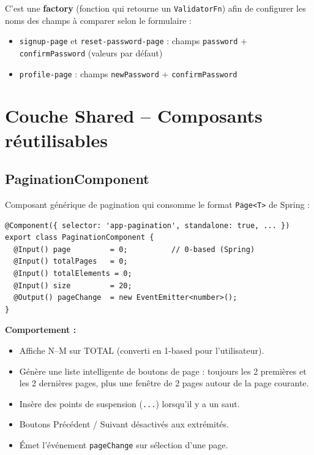 \documentclass[12pt,a4paper]{article}
\begin{document}
C'est une \textbf{factory} (fonction qui retourne un \texttt{ValidatorFn}) afin de
configurer les noms des champs à comparer selon le formulaire :
\begin{itemize}
  \item \texttt{signup-page} et \texttt{reset-password-page} : champs \texttt{password}
        + \texttt{confirmPassword} (valeurs par défaut)
  \item \texttt{profile-page} : champs \texttt{newPassword} + \texttt{confirmPassword}
\end{itemize}

\section{Couche Shared -- Composants réutilisables}

\subsection{PaginationComponent}

Composant générique de pagination qui consomme le format \texttt{Page<T>} de Spring :

\begin{lstlisting}
@Component({ selector: 'app-pagination', standalone: true, ... })
export class PaginationComponent {
  @Input() page         = 0;          // 0-based (Spring)
  @Input() totalPages   = 0;
  @Input() totalElements = 0;
  @Input() size         = 20;
  @Output() pageChange  = new EventEmitter<number>();
}
\end{lstlisting}

\textbf{Comportement :}
\begin{itemize}
  \item Affiche \og N--M sur TOTAL \fg{} (converti en 1-based pour l'utilisateur).
  \item Génère une liste intelligente de boutons de page : toujours les 2 premières
        et les 2 dernières pages, plus une fenêtre de 2 pages autour de la page courante.
  \item Insère des points de suspension (\texttt{...}) lorsqu'il y a un saut.
  \item Boutons Précédent / Suivant désactivés aux extrémités.
  \item Émet l'événement \texttt{pageChange} sur sélection d'une page.
\end{itemize}
\end{document}
